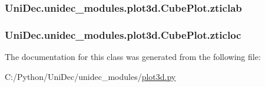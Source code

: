\subsubsection[{zticlab}]{\setlength{\rightskip}{0pt plus 5cm}Uni\+Dec.\+unidec\+\_\+modules.\+plot3d.\+Cube\+Plot.\+zticlab}\label{class_uni_dec_1_1unidec__modules_1_1plot3d_1_1_cube_plot_a6e40b70f52af024b9a43a8e65da546b7}
\hypertarget{class_uni_dec_1_1unidec__modules_1_1plot3d_1_1_cube_plot_a2b0b40386d29ecd1751114b53d795a90}{}
\subsubsection[{zticloc}]{\setlength{\rightskip}{0pt plus 5cm}Uni\+Dec.\+unidec\+\_\+modules.\+plot3d.\+Cube\+Plot.\+zticloc}\label{class_uni_dec_1_1unidec__modules_1_1plot3d_1_1_cube_plot_a2b0b40386d29ecd1751114b53d795a90}


The documentation for this class was generated from the following file\+:\begin{DoxyCompactItemize}
\item 
C\+:/\+Python/\+Uni\+Dec/unidec\+\_\+modules/\hyperlink{plot3d_8py}{plot3d.\+py}\end{DoxyCompactItemize}
